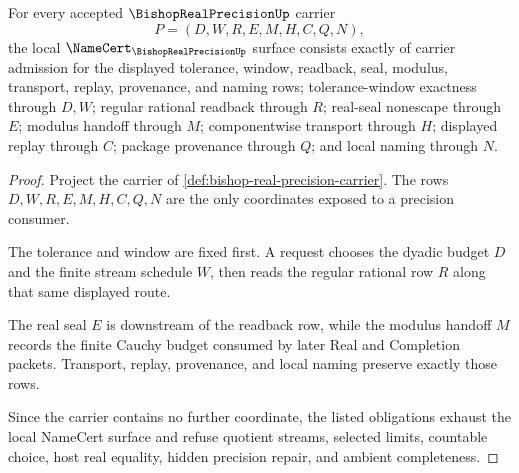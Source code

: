 \begin{theorem}
\label{thm:bishop-real-precision-namecert-obligations}
For every accepted $\BishopRealPrecisionUp$ carrier
$$
P=(D,W,R,E,M,H,C,Q,N),
$$
the local $\NameCert_{\BishopRealPrecisionUp}$ surface consists exactly of carrier admission for the displayed tolerance, window, readback, seal, modulus, transport, replay, provenance, and naming rows; tolerance-window exactness through $D,W$; regular rational readback through $R$; real-seal nonescape through $E$; modulus handoff through $M$; componentwise transport through $H$; displayed replay through $C$; package provenance through $Q$; and local naming through $N$.
\end{theorem}
\begin{proof}
Project the carrier of \autoref{def:bishop-real-precision-carrier}. The rows $D,W,R,E,M,H,C,Q,N$ are the only coordinates exposed to a precision consumer.

The tolerance and window are fixed first. A request chooses the dyadic budget $D$ and the finite stream schedule $W$, then reads the regular rational row $R$ along that same displayed route.

The real seal $E$ is downstream of the readback row, while the modulus handoff $M$ records the finite Cauchy budget consumed by later Real and Completion packets. Transport, replay, provenance, and local naming preserve exactly those rows.

Since the carrier contains no further coordinate, the listed obligations exhaust the local NameCert surface and refuse quotient streams, selected limits, countable choice, host real equality, hidden precision repair, and ambient completeness.
\end{proof}

